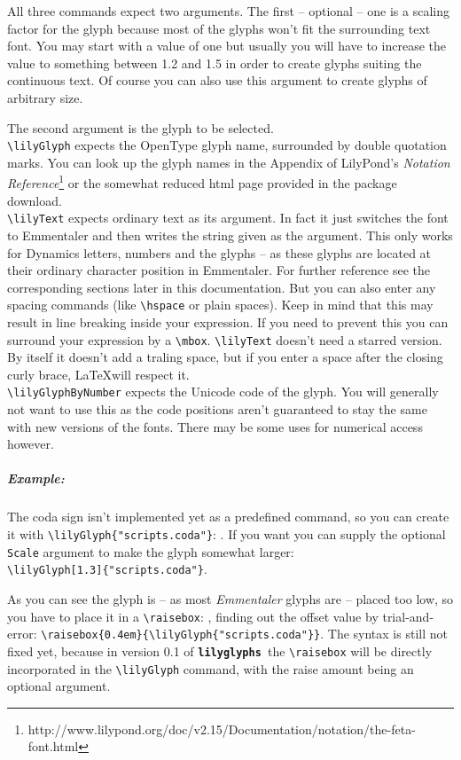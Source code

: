\documentclass{article}
\newcommand{\lilyglyphs}{\texttt{\textbf{lilyglyphs\,}}}
\newcommand*{\cmd}[1]{\texttt{\textbackslash #1}}
\begin{document}
All three commands expect two arguments. 
The first -- optional -- one is a scaling factor for the glyph because most of the glyphs won't fit the surrounding text font. 
You may start with a value of one but usually you will have to increase the value to something between 1.2 and 1.5 in order to create glyphs suiting the continuous text. 
Of course you can also use this argument to create glyphs of arbitrary size. 

The second argument is the glyph to be selected.\\
\cmd{lilyGlyph} expects the OpenType glyph name, surrounded by double quotation marks. 
You can look up the glyph names in the Appendix of LilyPond's \emph{Notation Reference}\footnote{http://www.lilypond.org/doc/v2.15/Documentation/notation/the-feta-font.html} or the somewhat reduced html page provided in the package download.\\
\cmd{lilyText} expects ordinary text as its argument. 
In fact it just switches the font to Emmentaler and then writes the string given as the argument. 
This only works for Dynamics letters, numbers and the glyphs  -- as these glyphs are located at their ordinary character position in Emmentaler. 
For further reference see the corresponding sections later in this documentation. 
But you can also enter any spacing commands (like \cmd{hspace} or plain spaces). 
Keep in mind that this may result in line breaking inside your expression. 
If you need to prevent this you can surround your expression by a \cmd{mbox}.
\cmd{lilyText} doesn't need a starred version. 
By itself it doesn't add a traling space, but if you enter a space after the closing curly brace, \LaTeX will respect it.\\ 
\cmd{lilyGlyphByNumber} expects the Unicode code of the glyph. 
You will generally not want to use this as the code positions aren't guaranteed to stay the same with new versions of the fonts. 
There may be some uses for numerical access however.


\subparagraph*{Example:}
The coda sign isn't implemented yet as a predefined command, so you can create it with \cmd{lilyGlyph\{"scripts.coda"\}}: . 
If you want you can supply the optional \texttt{Scale} argument to make the glyph somewhat larger: ~\\
\cmd{lilyGlyph[1.3]\{"scripts.coda"\}}.

As you can see the glyph is -- as most \emph{Emmentaler} glyphs are -- placed too low, so you have to place it in a  \cmd{raisebox}: , finding out the offset value by trial-and-error: \cmd{raisebox\{0.4em\}\{\textbackslash lilyGlyph\{"scripts.coda"\}\}}. 
The syntax is still not fixed yet, because in version 0.1 of \lilyglyphs the \cmd{raisebox} will be directly incorporated in the \cmd{lilyGlyph} command, with the raise amount being an optional argument.
\end{document}
